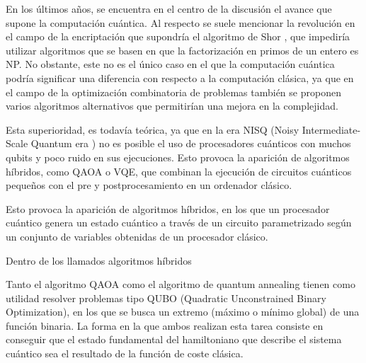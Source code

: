En los últimos años, se encuentra en el centro de la discusión el avance que supone la computación cuántica. Al respecto se suele mencionar la revolución en el campo de la encriptación que supondría el algoritmo de Shor \cite{Shor_algorithm}, que impediría utilizar algoritmos que se basen en que la factorización en primos de un entero es NP. No obstante, este no es el único caso en el que la computación cuántica podría significar una diferencia con respecto a la computación clásica, ya que en el campo de la optimización combinatoria  %
de problemas también se proponen varios algoritmos alternativos que permitirían una mejora en la complejidad.

Esta superioridad, es todavía teórica, ya que en la era NISQ (Noisy Intermediate-Scale Quantum era \cite{Quantum_computing_in_the_NISQ_era_and_beyond}) no es posible el uso de procesadores cuánticos con muchos qubits y poco ruido  %
en sus ejecuciones. Esto provoca la aparición de algoritmos híbridos, como QAOA \cite{qaoa_paper_original} o VQE, que combinan la ejecución de circuitos cuánticos pequeños con el pre y postprocesamiento en un ordenador clásico.

Esto provoca la aparición de algoritmos híbridos, en los que un procesador cuántico genera un estado cuántico a través de un circuito parametrizado según un conjunto de variables obtenidas de un procesador clásico.

Dentro de los llamados algoritmos híbridos



Tanto el algoritmo QAOA como el algoritmo de quantum annealing tienen como utilidad resolver problemas tipo QUBO (Quadratic Unconstrained Binary Optimization), en los que se busca un extremo (máximo o mínimo global) de una función binaria. La forma en la que ambos realizan esta tarea consiste en conseguir que el estado fundamental  %
 del hamiltoniano que describe el sistema cuántico sea el resultado de la función de coste clásica.

